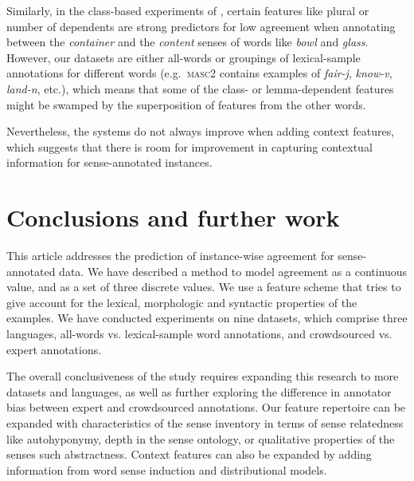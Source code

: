 \documentclass[11pt,a4paper]{article}
\begin{document}
Similarly, in the class-based experiments of , certain features like plural or number of dependents are strong predictors for low agreement when annotating between the \textit{container} and the \textit{content} senses of words like \textit{bowl} and \textit{glass}. However,
our datasets are either all-words or groupings of lexical-sample annotations for different words (e.g.\ \textsc{masc2} contains examples of \textit{fair-j}, \textit{know-v}, \textit{land-n}, etc.), which means that some of the class- or lemma-dependent features might be swamped by the superposition of features from the other words.  

Nevertheless, the systems do not always improve when adding context features, which suggests that there is room for improvement in capturing contextual information for sense-annotated instances.
\section{Conclusions and further work}
This article addresses the prediction of  instance-wise agreement for sense-annotated data. 
We have described a method to model agreement as a continuous value, and as a set of three discrete values. We use a feature scheme that tries to give account for the lexical, morphologic and syntactic properties of the examples. We have conducted experiments on nine datasets, which comprise three languages, all-words vs. lexical-sample word annotations, and crowdsourced vs. expert annotations. 


The overall conclusiveness of the study requires expanding this research to more datasets and languages, as well as further exploring the difference in annotator bias between expert and crowdsourced annotations. Our feature repertoire can be expanded with characteristics of the sense inventory in terms of sense relatedness like autohyponymy, depth in the sense ontology, or qualitative properties of the senses such abstractness. Context features can also be expanded by adding information from word sense induction and distributional models.
\end{document}
